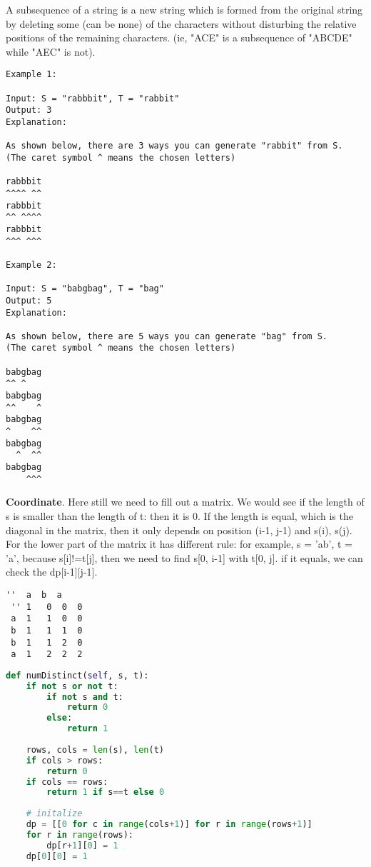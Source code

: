 \documentclass[../main.tex]{subfiles}
\begin{document}
\begin{examples}[resume]
A subsequence of a string is a new string which is formed from the original string by deleting some (can be none) of the characters without disturbing the relative positions of the remaining characters. (ie, "ACE" is a subsequence of "ABCDE" while "AEC" is not).
\begin{lstlisting}[numbers=none]
Example 1:

Input: S = "rabbbit", T = "rabbit"
Output: 3
Explanation:

As shown below, there are 3 ways you can generate "rabbit" from S.
(The caret symbol ^ means the chosen letters)

rabbbit
^^^^ ^^
rabbbit
^^ ^^^^
rabbbit
^^^ ^^^

Example 2:

Input: S = "babgbag", T = "bag"
Output: 5
Explanation:

As shown below, there are 5 ways you can generate "bag" from S.
(The caret symbol ^ means the chosen letters)

babgbag
^^ ^
babgbag
^^    ^
babgbag
^    ^^
babgbag
  ^  ^^
babgbag
    ^^^
\end{lstlisting}

\textbf{Coordinate}. Here still we need to fill out a matrix. We would see if the length of s is smaller than the length of t: then it is 0. If the length is equal, which is the diagonal in the matrix, then it only depends on position (i-1, j-1) and s(i), s(j). For the lower part of the matrix it has different rule: for example, s = 'ab', t = 'a', because s[i]!=t[j], then we need to find s[0, i-1] with t[0, j]. if it equals, we can check the dp[i-1][j-1]. 
\begin{lstlisting}[numbers=none]
    ''  a  b  a
 '' 1   0  0  0
 a  1   1  0  0
 b  1   1  1  0
 b  1   1  2  0
 a  1   2  2  2 
\end{lstlisting}
\begin{lstlisting}[language=Python]
def numDistinct(self, s, t):
    if not s or not t:
        if not s and t:
            return 0
        else:
            return 1
        
    rows, cols = len(s), len(t)
    if cols > rows:
        return 0
    if cols == rows:
        return 1 if s==t else 0
    
    # initalize 
    dp = [[0 for c in range(cols+1)] for r in range(rows+1)]
    for r in range(rows):
        dp[r+1][0] = 1            
    dp[0][0] = 1
    

\end{lstlisting}
\end{examples}
\end{document}
